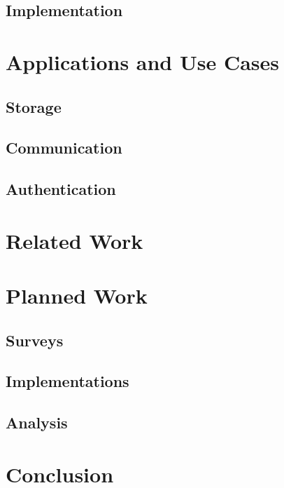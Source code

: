 \documentclass[defaultstyle,11pt]{thesis}
\begin{document}
\section{Implementation}

%
\chapter{Applications and Use Cases}
\label{chap:apps}

\section{Storage}
\section{Communication}
\section{Authentication}

%
\chapter{Related Work}
\label{chap:related}

%
\chapter{Planned Work}
\label{chap:planned}

\section{Surveys}
\section{Implementations}
\section{Analysis}

%
\chapter{Conclusion}
\label{chap:conclusion}


\nocite{*}                %

\appendix
%
%
\end{document}
